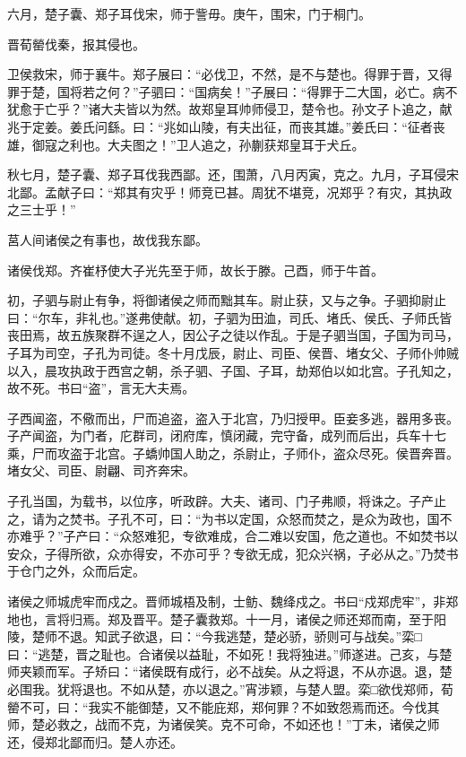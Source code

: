 \documentclass[]{article}
\begin{document}
六月，楚子囊、郑子耳伐宋，师于訾毋。庚午，围宋，门于桐门。

晋荀罃伐秦，报其侵也。

卫侯救宋，师于襄牛。郑子展曰：``必伐卫，不然，是不与楚也。得罪于晋，又得罪于楚，国将若之何？''子驷曰：``国病矣！''子展曰：``得罪于二大国，必亡。病不犹愈于亡乎？''诸大夫皆以为然。故郑皇耳帅师侵卫，楚令也。孙文子卜追之，献兆于定姜。姜氏问繇。曰：``兆如山陵，有夫出征，而丧其雄。''姜氏曰：``征者丧雄，御寇之利也。大夫图之！''卫人追之，孙蒯获郑皇耳于犬丘。

秋七月，楚子囊、郑子耳伐我西鄙。还，围萧，八月丙寅，克之。九月，子耳侵宋北鄙。孟献子曰：``郑其有灾乎！师竞已甚。周犹不堪竞，况郑乎？有灾，其执政之三士乎！''

莒人间诸侯之有事也，故伐我东鄙。

诸侯伐郑。齐崔杼使大子光先至于师，故长于滕。己酉，师于牛首。

初，子驷与尉止有争，将御诸侯之师而黜其车。尉止获，又与之争。子驷抑尉止曰：``尔车，非礼也。''遂弗使献。初，子驷为田洫，司氏、堵氏、侯氏、子师氏皆丧田焉，故五族聚群不逞之人，因公子之徒以作乱。于是子驷当国，子国为司马，子耳为司空，子孔为司徒。冬十月戊辰，尉止、司臣、侯晋、堵女父、子师仆帅贼以入，晨攻执政于西宫之朝，杀子驷、子国、子耳，劫郑伯以如北宫。子孔知之，故不死。书曰``盗''，言无大夫焉。

子西闻盗，不儆而出，尸而追盗，盗入于北宫，乃归授甲。臣妾多逃，器用多丧。子产闻盗，为门者，庀群司，闭府库，慎闭藏，完守备，成列而后出，兵车十七乘，尸而攻盗于北宫。子蟜帅国人助之，杀尉止，子师仆，盗众尽死。侯晋奔晋。堵女父、司臣、尉翩、司齐奔宋。

子孔当国，为载书，以位序，听政辟。大夫、诸司、门子弗顺，将诛之。子产止之，请为之焚书。子孔不可，曰：``为书以定国，众怒而焚之，是众为政也，国不亦难乎？''子产曰：``众怒难犯，专欲难成，合二难以安国，危之道也。不如焚书以安众，子得所欲，众亦得安，不亦可乎？专欲无成，犯众兴祸，子必从之。''乃焚书于仓门之外，众而后定。

诸侯之师城虎牢而戍之。晋师城梧及制，士鲂、魏绛戍之。书曰``戍郑虎牢''，非郑地也，言将归焉。郑及晋平。楚子囊救郑。十一月，诸侯之师还郑而南，至于阳陵，楚师不退。知武子欲退，曰：``今我逃楚，楚必骄，骄则可与战矣。''栾□曰：``逃楚，晋之耻也。合诸侯以益耻，不如死！我将独进。''师遂进。己亥，与楚师夹颖而军。子矫曰：``诸侯既有成行，必不战矣。从之将退，不从亦退。退，楚必围我。犹将退也。不如从楚，亦以退之。''宵涉颖，与楚人盟。栾□欲伐郑师，荀罃不可，曰：``我实不能御楚，又不能庇郑，郑何罪？不如致怨焉而还。今伐其师，楚必救之，战而不克，为诸侯笑。克不可命，不如还也！''丁未，诸侯之师还，侵郑北鄙而归。楚人亦还。
\end{document}
